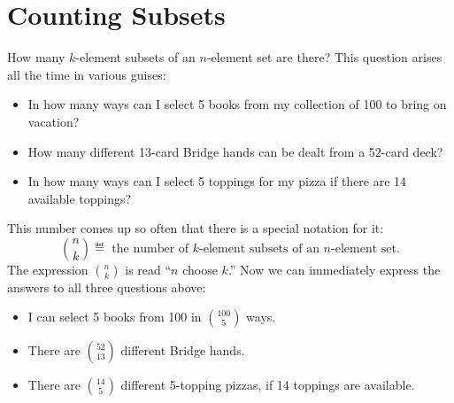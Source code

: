 
\begin{problems}
  \homeworkproblems

  \classproblems

  \examproblems

\end{problems}

\section{Counting Subsets}\label{combinations_sec}

How many $k$-element subsets of an $n$-element set are there?  This
question arises all the time in various guises:

\begin{itemize}

\item In how many ways can I select 5 books from my collection of 100
to bring on vacation?

\item How many different 13-card Bridge hands can be dealt from a
52-card deck?

\item In how many ways can I select 5 toppings for my pizza if there
are 14 available toppings?

\end{itemize}

This number comes up so often that there is a special notation for it:
\[
\binom{n}{k} \eqdef \text{ the number of $k$-element subsets of an $n$-element set.}
\]
The expression $\binom{n}{k}$ is read ``$n$ choose $k$.''  Now we can
immediately express the answers to all three questions above:

\begin{itemize}

\item I can select 5 books from 100 in $\binom{100}{5}$ ways.

\item There are $\binom{52}{13}$ different Bridge hands.

\item There are $\binom{14}{5}$ different 5-topping pizzas, if 14
toppings are available.

\end{itemize}

